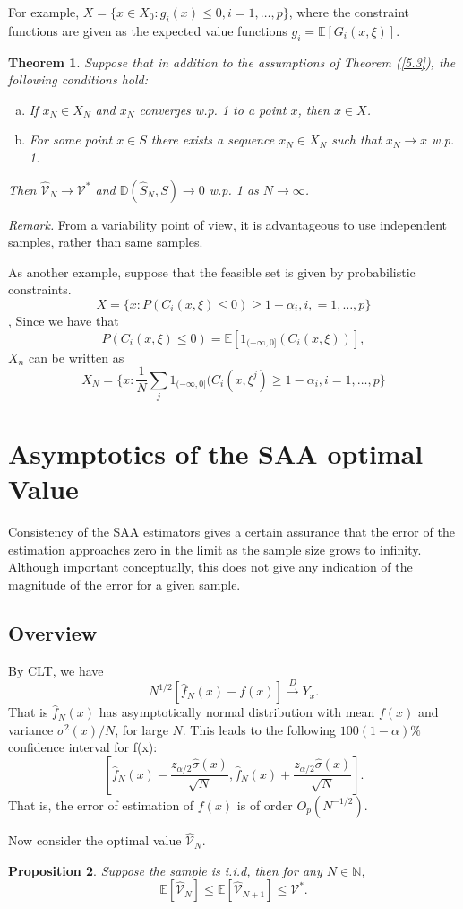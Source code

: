 \documentclass[a4pper,11pt]{article}
\newcommand{\be}{\mathbb E}
\newtheorem{thm}{Theorem}[section]
\newtheorem{prop}[thm]{Proposition}
\begin{document}
For example, $X=\{x\in X_0: g_i(x)\leq 0,i=1,\dots,p\}$, where the constraint functions are given as the expected value functions $g_i=\mathbb E [G_i(x,\xi)]$.
\begin{thm}
	Suppose that in addition to the assumptions of Theorem (\ref{5.3}), the following conditions hold:
	\begin{enumerate}[(a)]
		\item If $x_N\in X_N$ and $x_N$ converges w.p. 1 to a point $x$, then $x\in X$.
		\item For some point $x\in S$ there exists a sequence $x_N\in X_N$ such that $x_N\to x$ w.p. 1.
	\end{enumerate}
	Then  $\hat {\mathcal V}_N\to \mathcal V^*$ and $\mathbb D(\hat S_N,S)\to 0$ w.p. 1 as $N\to \infty$.
\end{thm}
\textit{Remark.} From a variability point of view, it is advantageous to use independent samples, rather than same samples.

As another example, suppose that the feasible set is given by probabilistic constraints.
$$
	X=\{x: P(C_i(x,\xi)\leq 0)\geq 1-\alpha_i, i,=1,\dots,p\}
$$,
Since we have that
$$
	P(C_i(x,\xi)\leq 0) = \mathbb E[1_{(-\infty,0]}(C_i(x,\xi))],
$$
$X_n$ can be written as
$$
	X_N = \{x: \frac{1}{N}\sum_j 1_{(-\infty,0]}(C_i(x,\xi^j)\geq 1-\alpha_i,i=1,\dots,p\}
$$
\section{Asymptotics of the SAA optimal Value}
Consistency of the SAA estimators gives a certain assurance that the error of the estimation approaches zero in the limit as the sample size grows to infinity. Although important conceptually, this does not give any indication of the magnitude of the error for a given sample.
\subsection{Overview}
By CLT, we have
$$N^{1/2}[\hat f_N(x)-f(x)]\stackrel{D}\to Y_x.
$$
That is $\hat f_N(x)$ has asymptotically normal distribution with mean $f(x)$ and variance $\sigma^2(x)/N$, for large $N$.  This leads to the following $100(1-\alpha)\%$ confidence interval for f(x):
$$
	[\hat f_N(x)-\frac{z_{\alpha/2}\hat \sigma(x)}{\sqrt{N}},\hat f_N(x)+\frac{z_{\alpha/2}\hat \sigma(x)}{\sqrt{N}}].
$$
That is, the error of estimation of $f(x)$ is of order $O_p(N^{-1/2})$.

Now consider the optimal value $\hat{ \mathcal{V}}_N$.
\begin{prop}
	Suppose the sample is i.i.d, then for any $N\in \mathbb N$,
	$$
		\be[\hat {\mathcal V}_N]\leq \be [\hat {\mathcal V}_{N+1}]\leq \mathcal V^*.
	$$
\end{prop}
\end{document}
